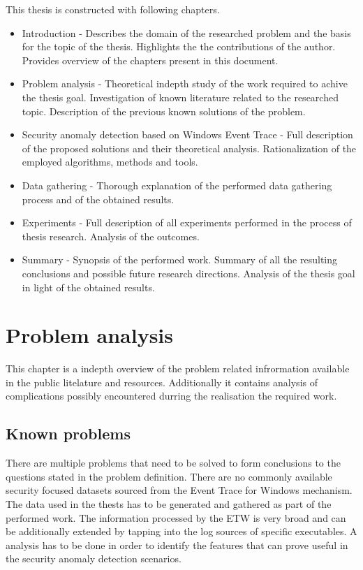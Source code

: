\documentclass[a4paper,twoside,12pt]{book}
\begin{document}
This thesis is constructed with following chapters.
\begin{itemize}
	\item Introduction - Describes the domain of the researched problem and the basis for the 
	topic of the thesis. Highlights the the contributions of the author. Provides overview of the 
	chapters present in this document.
	\item Problem analysis - Theoretical indepth study of the work required to achive the thesis
	goal. Investigation of known literature related to the researched topic. Description of the 
	previous known solutions of the problem. 
	\item Security anomaly detection based on Windows Event Trace - Full description of the proposed
	solutions and their theoretical analysis. Rationalization of the employed algorithms, methods 
	and tools.
	\item Data gathering - Thorough explanation of the performed data gathering process and of 
	the obtained results.
 	\item Experiments - Full description of all experiments performed in the process of thesis 
 	research. Analysis of the outcomes.
	\item Summary - Synopsis of the performed work. Summary of all the resulting conclusions and 
	possible future research directions. Analysis of the thesis goal in light of the obtained
	results. 
\end{itemize}

\chapter{Problem analysis}

This chapter is a indepth overview of the problem related infrormation available in the public 
litelature and resources. Additionally it contains analysis of complications possibly encountered
durring the realisation the required work.  

\section{Known problems}
There are multiple problems that need to be solved to form conclusions to the questions stated in the
problem definition.
There are no commonly available security focused datasets sourced from the Event Trace for 
Windows mechanism. The data used in the thests has to be generated and gathered as part of the
performed work. The information processed by the ETW is very broad and can be additionally extended 
by tapping into the log sources of specific executables.
A analysis has to be done in order to identify the features that can prove useful in the security
anomaly detection scenarios. 
\end{document}
